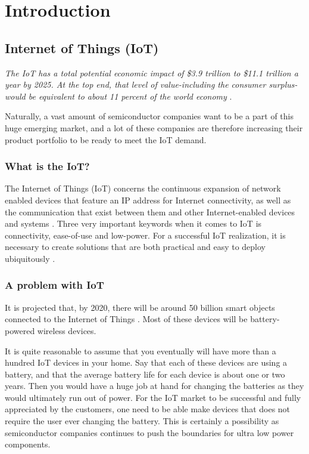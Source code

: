 \chapter{Introduction}

\section{Internet of Things (IoT)}

\textit{The IoT has a total potential economic impact of \$3.9 trillion to \$11.1 trillion a year by 2025. At the top end, that level of value-including the consumer surplus-would be equivalent to about 11 percent of the world economy} \cite{mckinsey15}.

Naturally, a vast amount of semiconductor companies want to be a part of this huge emerging market, and a lot of these companies are therefore increasing their product portfolio to be ready to meet the IoT demand. 

\subsection{What is the IoT?}

The Internet of Things (IoT) concerns the continuous expansion of network enabled devices that feature an IP address for Internet connectivity, as well as the communication that exist between them and other Internet-enabled devices and systems \cite{webopedia}. Three very important keywords when it comes to IoT is connectivity, ease-of-use and low-power. For a successful IoT realization, it is necessary to create solutions that are both practical and easy to deploy ubiquitously \cite{embedded_IoT}. %

\subsection{A problem with IoT}

It is projected that, by 2020, there will be around 50 billion smart objects connected to the Internet of Things \cite{jayakumar14}. Most of these devices will be battery-powered wireless devices. 

It is quite reasonable to assume that you eventually will have more than a hundred IoT devices in your home. Say that each of these devices are using a battery, and that the average battery life for each device is about one or two years. Then you would have a huge job at hand for changing the batteries as they would ultimately run out of power. For the IoT market to be successful and fully appreciated by the customers, one need to be able make devices that does not require the user ever changing the battery. This is certainly a possibility as semiconductor companies continues to push the boundaries for ultra low power components.  

